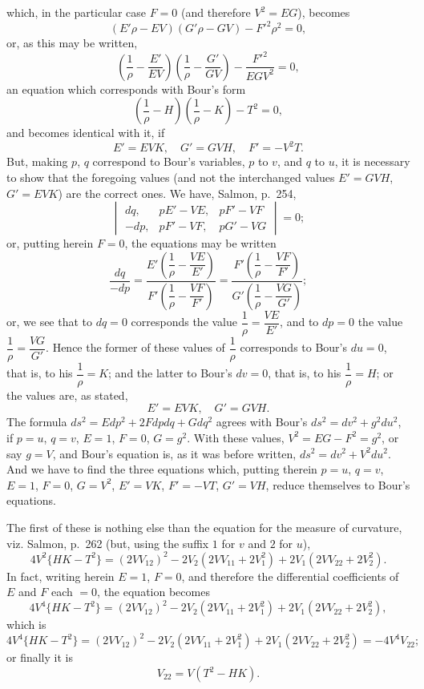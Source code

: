 \documentclass[11pt,a4paper]{book}
\begin{document}
which, in the particular case $F = 0$ (and therefore $V^2 = EG$), becomes
\[
(E'\rho - EV)(G'\rho - GV) - F'^2\rho^2 = 0,
\]
or, as this may be written,
\[
\left(\frac{1}{\rho} - \frac{E'}{EV}\right)\left(\frac{1}{\rho} - \frac{G'}{GV}\right) - \frac{F'^2}{EGV^2} = 0,
\]
an equation which corresponds with Bour's form
\[
\left(\frac{1}{\rho} - H\right)\left(\frac{1}{\rho} - K\right) - T^2 = 0,
\]
and becomes identical with it, if
\[
E' = EVK,\quad G' = GVH,\quad F' = -V^2T.
\]
But, making $p$, $q$ correspond to Bour's variables, $p$ to $v$, and $q$ to $u$, it is necessary to show that the foregoing values (and not the interchanged values $E' = GVH$, $G' = EVK$) are the correct ones. We have, Salmon, p.~254,
\[
\begin{vmatrix}
dq, & pE' - VE, & pF' - VF \\
-dp, & pF' - VF, & pG' - VG
\end{vmatrix}
= 0;
\]
or, putting herein $F = 0$, the equations may be written
\[
\frac{dq}{-dp} = \frac{E'\left(\dfrac{1}{\rho} - \dfrac{VE}{E'}\right)}{F'\left(\dfrac{1}{\rho} - \dfrac{VF}{F'}\right)} = \frac{F'\left(\dfrac{1}{\rho} - \dfrac{VF}{F'}\right)}{G'\left(\dfrac{1}{\rho} - \dfrac{VG}{G'}\right)};
\]
or, we see that to $dq = 0$ corresponds the value $\dfrac{1}{\rho} = \dfrac{VE}{E'}$, and to $dp = 0$ the value $\dfrac{1}{\rho} = \dfrac{VG}{G'}$. Hence the former of these values of $\dfrac{1}{\rho}$ corresponds to Bour's $du = 0$, that is, to his $\dfrac{1}{\rho} = K$; and the latter to Bour's $dv = 0$, that is, to his $\dfrac{1}{\rho} = H$; or the values are, as stated,
\[
E' = EVK,\quad G' = GVH.
\]
The formula $ds^2 = Edp^2 + 2Fdpdq + Gdq^2$ agrees with Bour's $ds^2 = dv^2 + g^2 du^2$, if $p = u$, $q = v$, $E = 1$, $F = 0$, $G = g^2$. With these values, $V^2 = EG - F^2 = g^2$, or say $g = V$, and Bour's equation is, as it was before written, $ds^2 = dv^2 + V^2 du^2$. And we have to find the three equations which, putting therein $p = u$, $q = v$, $E = 1$, $F = 0$, $G = V^2$, $E' = VK$, $F' = -VT$, $G' = VH$, reduce themselves to Bour's equations.

The first of these is nothing else than the equation for the measure of curvature, viz. Salmon, p.~262 (but, using the suffix $1$ for $v$ and $2$ for $u$),
\[
4V^2\{HK - T^2\} = (2VV_{12})^2 - 2V_2(2VV_{11} + 2V_1^2) + 2V_1(2VV_{22} + 2V_2^2).
\]
In fact, writing herein $E = 1$, $F = 0$, and therefore the differential coefficients of $E$ and $F$ each $= 0$, the equation becomes
\[
4V^4\{HK - T^2\} = (2VV_{12})^2 - 2V_2(2VV_{11} + 2V_1^2) + 2V_1(2VV_{22} + 2V_2^2),
\]
which is
\[
4V^4\{HK - T^2\} = (2VV_{12})^2 - 2V_2(2VV_{11} + 2V_1^2) + 2V_1(2VV_{22} + 2V_2^2) = -4V^4V_{22};
\]
or finally it is
\[
V_{22} = V(T^2 - HK).
\]
\end{document}
